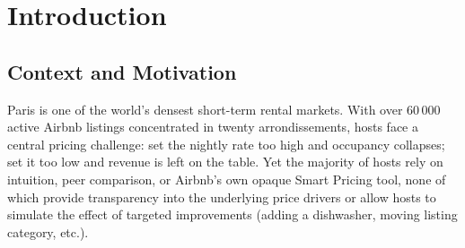 \documentclass[12pt, a4paper]{article}
\begin{document}
\begin{abstract}
\noindent
This report presents a data-driven analysis of Airbnb listing prices in Paris, drawing on a dataset of 64\,690 active listings from Inside Airbnb (filtered to 63\,520 after outlier removal). We address the central question: \textit{what are the key drivers of nightly prices, and can we build a reliable predictive model to help hosts set an optimal price?} Our pipeline combines exploratory data analysis, feature engineering (33 raw columns to 78 candidate features, then 37 selected), supervised regression and classification, amenity value analysis, and unsupervised segmentation. Across eight models, a GridSearch-tuned XGBoost pipeline achieves the strongest out-of-sample performance: R\textsuperscript{2}~=~0.657 on the log-price scale, with a back-transformed MAE of \euro{}27.2 on a median listing price of \euro{}80. Accommodation capacity (\texttt{accommodates}, \texttt{bedrooms}), room type, neighbourhood, and amenity count are the dominant price drivers. K-Means clustering (k~=~4) identifies four economically coherent market segments, independently validated by Ward hierarchical clustering (78\% agreement). These findings are translated into five actionable recommendations for Parisian hosts.
\end{abstract}

\tableofcontents
\newpage

\section{Introduction}

\subsection{Context and Motivation}

Paris is one of the world's densest short-term rental markets. With over 60\,000 active Airbnb listings concentrated in twenty arrondissements, hosts face a central pricing challenge: set the nightly rate too high and occupancy collapses; set it too low and revenue is left on the table. Yet the majority of hosts rely on intuition, peer comparison, or Airbnb's own opaque Smart Pricing tool, none of which provide transparency into the underlying price drivers or allow hosts to simulate the effect of targeted improvements (adding a dishwasher, moving listing category, etc.).
\end{document}
